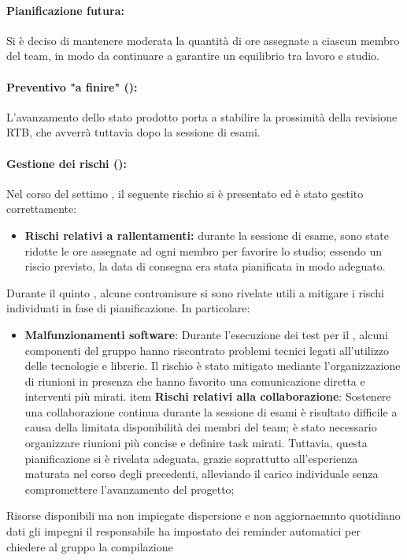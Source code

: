 \paragraph*{Pianificazione futura:}
\par Si è deciso di mantenere moderata la quantità di ore assegnate a ciascun membro del team, in modo da continuare a garantire un equilibrio tra lavoro e studio.

\paragraph*{Preventivo "a finire" ():}
\par L'avanzamento dello stato prodotto porta a stabilire la prossimità della revisione RTB, che avverrà tuttavia dopo la sessione di esami.

\paragraph*{Gestione dei rischi ():}
\par Nel corso del settimo , il seguente rischio si è presentato ed è stato gestito correttamente:
\begin{itemize}
  \item \textbf{Rischi relativi a rallentamenti:} durante la sessione di esame, sono state ridotte le ore assegnate ad ogni membro per favorire lo studio; essendo un riscio previsto, la data di consegna era stata pianificata in modo adeguato.
\end{itemize}

\vspace{0.5\baselineskip}
\par Durante il quinto , alcune contromisure si sono rivelate utili a mitigare i rischi individuati in fase di pianificazione. In particolare:
\begin{itemize}
  \item \textbf{Malfunzionamenti software}: Durante l'esecuzione dei test per il , alcuni componenti del gruppo hanno riscontrato problemi tecnici legati all'utilizzo delle tecnologie e librerie. Il rischio è stato mitigato mediante l'organizzazione di riunioni in presenza che hanno favorito una comunicazione diretta e interventi più mirati.
  item \textbf{Rischi relativi alla collaborazione}: Sostenere una collaborazione continua durante la sessione di esami è risultato difficile a causa della limitata disponibilità dei membri del team; è stato necessario organizzare riunioni più concise e definire task mirati. Tuttavia, questa pianificazione si è rivelata adeguata, grazie soprattutto all'esperienza maturata nel corso degli  precedenti, alleviando il carico individuale senza compromettere l'avanzamento del progetto;
\end{itemize}
Risorse disponibili ma non impiegate dispersione e non aggiornaemnto quotidiano dati gli impegni il responsabile ha impostato dei reminder automatici per chiedere al gruppo la compilazione